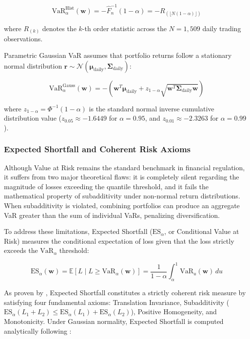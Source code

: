 \begin{equation}
  \text{VaR}_\alpha^{\text{Hist}}(\mathbf{w}) = -\widehat{F}_n^{-1}(1 - \alpha) = -R_{(\lfloor N(1-\alpha) \rfloor)}
\end{equation}

where $R_{(k)}$ denotes the $k$-th order statistic across the $N = 1,509$ daily trading observations.

Parametric Gaussian VaR assumes that portfolio returns follow a stationary normal distribution $\mathbf{r} \sim \mathcal{N}(\boldsymbol{\mu}_{\text{daily}}, \boldsymbol{\Sigma}_{\text{daily}})$:

\begin{equation}
  \text{VaR}_\alpha^{\text{Gauss}}(\mathbf{w}) = -\left( \mathbf{w}^T \boldsymbol{\mu}_{\text{daily}} + z_{1-\alpha} \sqrt{\mathbf{w}^T \boldsymbol{\Sigma}_{\text{daily}} \mathbf{w}} \right)
\end{equation}

where $z_{1-\alpha} = \Phi^{-1}(1 - \alpha)$ is the standard normal inverse cumulative distribution value ($z_{0.05} \approx -1.6449$ for $\alpha = 0.95$, and $z_{0.01} \approx -2.3263$ for $\alpha = 0.99$).

\subsubsection{Expected Shortfall and Coherent Risk Axioms}

Although Value at Risk remains the standard benchmark in financial regulation, it suffers from two major theoretical flaws: it is completely silent regarding the magnitude of losses exceeding the quantile threshold, and it fails the mathematical property of subadditivity under non-normal return distributions. When subadditivity is violated, combining portfolios can produce an aggregate VaR greater than the sum of individual VaRs, penalizing diversification.

To address these limitations, Expected Shortfall ($\text{ES}_\alpha$, or Conditional Value at Risk) measures the conditional expectation of loss given that the loss strictly exceeds the $\text{VaR}_\alpha$ threshold:

\begin{equation}
  \text{ES}_\alpha(\mathbf{w}) = \mathbb{E} \left[ L \mid L \ge \text{VaR}_\alpha(\mathbf{w}) \right] = \frac{1}{1 - \alpha} \int_{\alpha}^{1} \text{VaR}_u(\mathbf{w}) \, du
\end{equation}

As proven by \textcite{artzner1999}, Expected Shortfall constitutes a strictly coherent risk measure by satisfying four fundamental axioms: Translation Invariance, Subadditivity ($\text{ES}_\alpha(L_1 + L_2) \le \text{ES}_\alpha(L_1) + \text{ES}_\alpha(L_2)$), Positive Homogeneity, and Monotonicity. Under Gaussian normality, Expected Shortfall is computed analytically following \textcite{fabozzi2002}:

